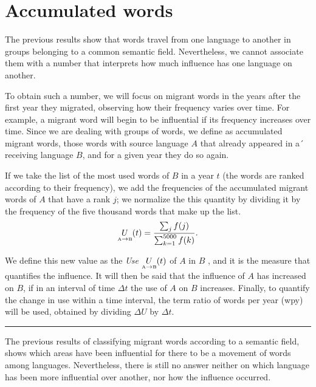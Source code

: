 \documentclass[10pt,letterpaper]{article} %
\begin{document}
	\section*{Accumulated words} %
	
	
	
	The previous results show that words travel from one language to another in groups belonging to a common semantic field. Nevertheless, we cannot associate them with a number that interprets how much influence has one language on another.
	
	To obtain such a number, we will focus on migrant words in the years after the first year they migrated, observing how their frequency varies over time. For example, a migrant word will begin to be influential if its frequency increases over time. Since we are dealing with groups of words, we define as accumulated migrant words, those words with source language $A$ that already appeared in a´ receiving language $B$, and for a given year they do so again.
	
	If we take the list of the most used words of $B$ in a year $t$ (the words are ranked according to their frequency), we add the frequencies of the accumulated migrant words of $A$ that have a rank $j$; we normalize the this quantity by dividing it by the frequency of the five thousand words that make up the list.
	\begin{equation}
	\label{ec.fuso}
	\underset{ \text{\tiny A} \to  \text{\tiny B} }{U}(t) = \frac{\sum_{j} f(j)}{\sum_{k=1}^{5000} f(k)}.
	\end{equation}
	
	We define this new value as the \textit{Use} $\underset{ \text{\tiny A} \to \text{\tiny B} }{U}(t)$ of $A$ in $B$ , and it is the measure that quantifies the influence. It will then be said that the influence of $A$ has increased on $B$, if in an interval of time $\Delta t$ the use of $A$ on $B$ increases. Finally, to quantify the change in use within a time interval, the term ratio of words per year (wpy) will be used, obtained by dividing $\Delta U$  by  $\Delta t$.
	
	
	\noindent\rule{10cm}{0.4pt}
	
	The previous results of classifying migrant words according to a semantic
	field, shows which areas have been influential for there to be a movement of
	words among languages. Nevertheless, there is still no answer neither on which
	language has been more influential over another, nor how the influence
	occurred.
	
\end{document}
